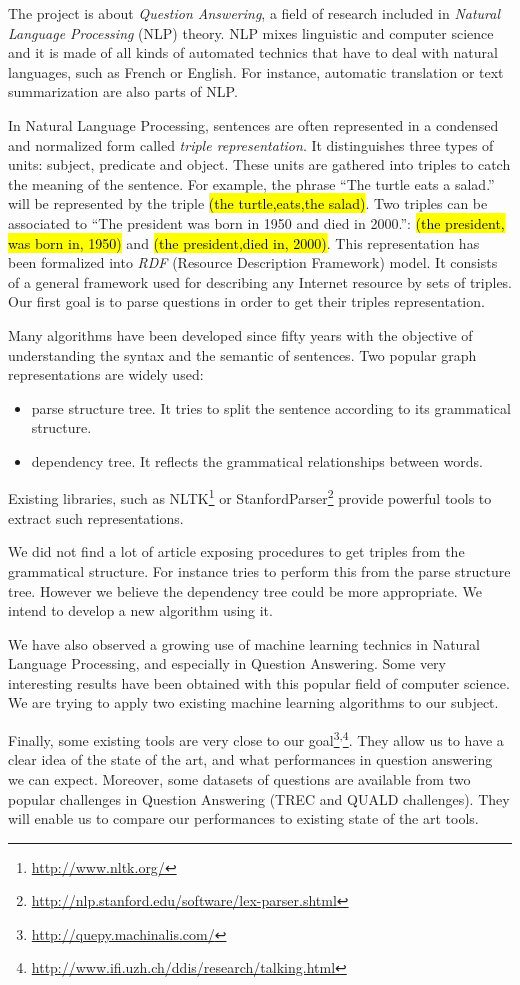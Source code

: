 The project is about \textit{Question Answering}, a field of research included in \textit{Natural Language Processing} (NLP) theory. NLP mixes linguistic and computer science and it is made of all kinds of automated technics that have to deal with natural languages, such as French or English. For instance, automatic translation or text summarization are also parts of NLP.

In Natural Language Processing, sentences are often represented in a condensed and normalized form called \textit{triple representation}. It distinguishes three types of units: subject, predicate and object. These units are gathered into triples to catch the meaning of the sentence. For example, the phrase ``The turtle eats a salad.'' will be represented by the triple \hl{(the turtle,eats,the salad)}. Two triples can be associated to ``The president was born in 1950 and died in 2000.'': \hl{(the president, was born in, 1950)} and \hl{(the president,died in, 2000)}. This representation has been formalized into \textit{RDF} (Resource Description Framework) model. It consists of a general framework used for describing any Internet resource by sets of triples. Our first goal is to parse questions in order to get their triples representation.

Many algorithms have been developed since fifty years with the objective of understanding the syntax and the semantic of sentences. Two popular graph representations are widely used:
\begin{itemize}
 \item parse structure tree. It tries to split the sentence according to its grammatical structure.
 \item dependency tree. It reflects the grammatical relationships between words.
\end{itemize}
Existing libraries, such as NLTK\footnote{\url{http://www.nltk.org/}} or StanfordParser\footnote{\url{http://nlp.stanford.edu/software/lex-parser.shtml}} provide powerful tools to extract such representations.

We did not find a lot of article exposing procedures to get triples from the grammatical structure. For instance \cite{tripleparsetree} tries to perform this from the parse structure tree. However we believe the dependency tree could be more appropriate. We intend to develop a new algorithm using it.

We have also observed a growing use of machine learning technics in Natural Language Processing, and especially in Question Answering. Some very interesting results have been obtained with this popular field of computer science. We are trying to apply two existing machine learning algorithms to our subject.

Finally, some existing tools are very close to our goal\footnote{\url{http://quepy.machinalis.com/}}\textsuperscript{,}\footnote{\url{http://www.ifi.uzh.ch/ddis/research/talking.html}}. They allow us to have a clear idea of the state of the art, and what performances in question answering we can expect. Moreover,  some datasets of questions are available from two popular challenges in Question Answering (TREC and QUALD challenges). They will enable us to compare our performances to existing state of the art tools.
